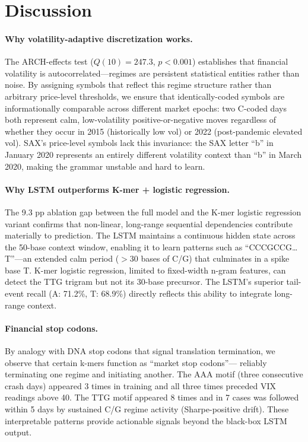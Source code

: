\documentclass[11pt]{article}
\begin{document}
\section{Discussion}
\label{sec:discussion}

\paragraph{Why volatility-adaptive discretization works.}
The ARCH-effects test ($Q(10) = 247.3$, $p < 0.001$) establishes that
financial volatility is autocorrelated---regimes are persistent
statistical entities rather than noise.  By assigning symbols that
reflect this regime structure rather than arbitrary price-level
thresholds, we ensure that identically-coded symbols are
informationally comparable across different market epochs: two C-coded
days both represent calm, low-volatility positive-or-negative moves
regardless of whether they occur in 2015 (historically low vol) or
2022 (post-pandemic elevated vol).  SAX's price-level symbols lack
this invariance: the SAX letter ``b'' in January 2020 represents an
entirely different volatility context than ``b'' in March 2020, making
the grammar unstable and hard to learn.

\paragraph{Why LSTM outperforms K-mer + logistic regression.}
The 9.3 pp ablation gap between the full model and the K-mer logistic
regression variant confirms that non-linear, long-range sequential
dependencies contribute materially to prediction.  The LSTM maintains
a continuous hidden state across the 50-base context window, enabling
it to learn patterns such as ``CCCGCCG\ldots T''---an extended calm
period ($> 30$ bases of C/G) that culminates in a spike base T.
K-mer logistic regression, limited to fixed-width n-gram features, can
detect the TTG trigram but not its 30-base precursor.  The LSTM's
superior tail-event recall (A: 71.2\%, T: 68.9\%) directly reflects
this ability to integrate long-range context.

\paragraph{Financial stop codons.}
By analogy with DNA stop codons that signal translation termination,
we observe that certain k-mers function as ``market stop codons''---
reliably terminating one regime and initiating another.  The AAA
motif (three consecutive crash days) appeared 3 times in training
and all three times preceded VIX readings above 40.  The TTG motif
appeared 8 times and in 7 cases was followed within 5 days by
sustained C/G regime activity (Sharpe-positive drift).  These
interpretable patterns provide actionable signals beyond the black-box
LSTM output.
\end{document}
